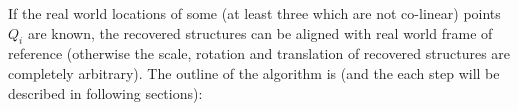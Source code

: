 \documentclass[12pt]{article}
\begin{document}

If the real world locations of some (at least three which are not co-linear)
points $Q_i$ are known, the recovered structures can be aligned with real world
frame of reference (otherwise the scale, rotation and translation of recovered
structures are completely arbitrary). The outline of the algorithm is (and
the each step will be described in following sections):
\end{document}
